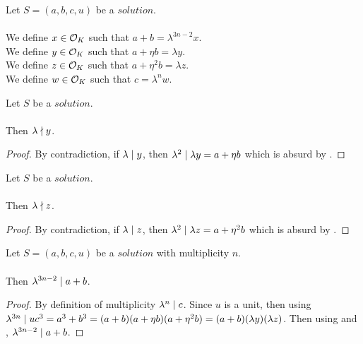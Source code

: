 \begin{definition}[$x,y,z,w$]
    \label{def:Solution_x_y_z_w}
    \leanok
    Let $S=(a, b, c, u)$ be a $solution$.\\\\
    We define $x \in \mathcal{O}_K$ such that $a + b = \lambda^{3n-2}  x$.\\
    We define $y \in \mathcal{O}_K$ such that $a + \eta  b = \lambda  y$.\\
    We define $z \in \mathcal{O}_K$ such that $a + \eta^2  b = \lambda  z$.\\
    We define $w \in \mathcal{O}_K$ such that $c = \lambda^n  w$.
\end{definition}

\begin{lemma}
    \label{lmm:lambda_not_dvd_y}
    \leanok
    Let $S$ be a $solution$.\\\\
    Then $\lambda \nmid y$.
\end{lemma}
\begin{proof}
    \leanok
    By contradiction, if $\lambda \mid y$, then $\lambda^2 \mid \lambda  y
    = a + \eta b$ which is absurd by .
\end{proof}

\begin{lemma}
    \label{lmm:lambda_not_dvd_z}
    \leanok
    Let $S$ be a $solution$.\\\\
    Then $\lambda \nmid z$.
\end{lemma}
\begin{proof}
    \leanok
    By contradiction, if $\lambda \mid z$, then $\lambda^2 \mid \lambda  z
    = a + \eta^2 b$ which is absurd by .
\end{proof}

\begin{lemma}
    \label{lmm:lambda_pow_dvd_a_add_b}
    \leanok
    Let $S=(a, b, c, u)$ be a $solution$ with multiplicity $n$.\\\\
    Then $\lambda^{3n -2} \mid a + b$.
\end{lemma}
\begin{proof}
    \leanok
    By definition of multiplicity $\lambda^n \mid c$. Since $u$ is a unit, then using 
    $\lambda^{3n} \mid u  c^3 = a^3 + b^3
    = (a+b)  (a + \eta  b)  (a + \eta^2  b)
    = (a+b)(\lambda y)(\lambda z)$.
    Then using  and ,
    $\lambda^{3n-2} \mid a+b$.
\end{proof}

